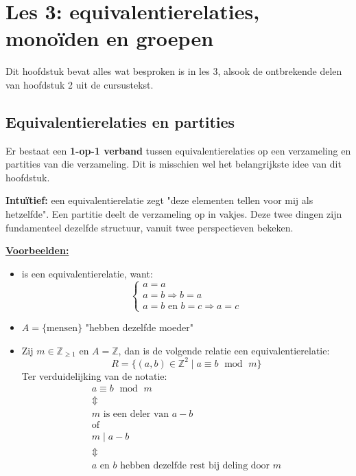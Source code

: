 \section{Les 3: equivalentierelaties, monoïden en groepen}

Dit hoofdstuk bevat alles wat besproken is in les 3, alsook de ontbrekende delen van hoofdstuk 2 uit de cursustekst.

\subsection{Equivalentierelaties en partities}


Er bestaat een \textbf{1-op-1 verband} tussen equivalentierelaties op een verzameling en partities van die verzameling. Dit is misschien wel het belangrijkste idee van dit hoofdstuk.

\textbf{Intuïtief:} een equivalentierelatie zegt "deze elementen tellen voor mij als hetzelfde". Een partitie deelt de verzameling op in vakjes. Deze twee dingen zijn fundamenteel dezelfde structuur, vanuit twee perspectieven bekeken.

\textbf{\underline{Voorbeelden:}}
\begin{itemize}
    \item \inlinetext{$=$} is een equivalentierelatie, want:
    \begin{equation*}
        \begin{cases}
            a=a \\
            a=b \Rightarrow b=a \\
            a=b \text{ en } b=c \Rightarrow a=c
        \end{cases}
    \end{equation*}
    \item $A = \{\text{mensen}\}$ "hebben dezelfde moeder"
    \item Zij $m \in \mathbb{Z}_{\ge 1}$ en $A=\mathbb{Z}$, dan is de volgende relatie een equivalentierelatie:
    \begin{equation*}
        R = \{(a,b) \in \mathbb{Z}^2 \mid a \equiv b \;\text{ mod }\;m\}
    \end{equation*}
    Ter verduidelijking van de notatie:
    \begin{equation*}
        \begin{gathered}
            a \equiv b \;\text{ mod }\;m \\
            \Updownarrow \\
            m\text{ is een deler van } a - b\\
            \text{of}\\
            m \mid a - b \\
            \Updownarrow \\
            a \text{ en } b \text{ hebben dezelfde rest bij deling door }m
        \end{gathered}
    \end{equation*}
\end{itemize}

